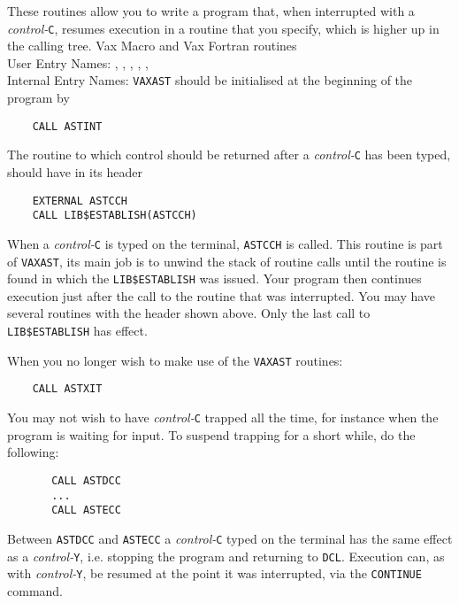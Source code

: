                     
                  
                
                \Revised{}
These routines allow you to write a program that, when interrupted
with a {\it control-}{\tt C}, resumes execution in a routine that you
specify, which is higher up in the calling tree.
\Structure
Vax Macro and Vax Fortran routines \\
User Entry Names: , , ,
, ,  \\
Internal Entry Names: 
\Usage
{\tt VAXAST} should be initialised at the beginning of the program by
\begin{verbatim}
    CALL ASTINT
\end{verbatim}
The routine to which control should be returned after a
{\it control-}{\tt C}
has been typed, should have in its header
\begin{verbatim}
    EXTERNAL ASTCCH
    CALL LIB$ESTABLISH(ASTCCH)
\end{verbatim}
When a {\it control-}{\tt C} is typed on the terminal, {\tt ASTCCH} is
called. This routine is part of {\tt VAXAST}, its main job is to unwind
the stack of routine calls until the routine is found in which the
{\tt LIB\$ESTABLISH} was issued.
Your program then continues execution just after the call to the routine
that was interrupted. You may have several routines with the header
shown above. Only the last call to {\tt LIB\$ESTABLISH} has effect.
\par
When you no longer wish to make use of the {\tt VAXAST} routines:
\begin{verbatim}
    CALL ASTXIT
\end{verbatim}
You may not wish to have {\it control-}{\tt C} trapped all the time,
for instance when the program is waiting for input.
To suspend trapping for a short while, do the following:
\begin{verbatim}
       CALL ASTDCC
       ...
       CALL ASTECC
\end{verbatim}
Between {\tt ASTDCC} and {\tt ASTECC} a {\it control-}{\tt C} typed on
the terminal has the same effect as a {\it control-}{\tt Y}, i.e.
stopping the program and returning to {\tt DCL}.
Execution can, as with {\it control-}{\tt Y}, be resumed at the point it
was interrupted, via the {\tt CONTINUE} command.
